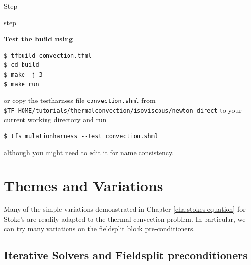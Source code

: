\begin{steps}{Step}
\begin{steps}{step}
   \end{steps}
  \item \textbf{Test the build using}
   \begin{lstlisting}[style=Bash]
$ tfbuild convection.tfml
$ cd build
$ make -j 3
$ make run
   \end{lstlisting}
or copy the testharness file \texttt{convection.shml} from
\texttt{\$TF\_HOME/tutorials/thermalconvection/isoviscous/newton\_direct}
to your current working directory and run
\begin{lstlisting}[style=Bash]
  $ tfsimulationharness --test convection.shml 
\end{lstlisting}
although you might need to edit it for name consistency.

\end{steps}


\section{Themes and Variations}

Many of the simple variations demonstrated in Chapter
\ref{cha:stokes-equation} for Stoke's  are readily adapted
to the thermal convection problem.  In particular, we can try many
variations on the fieldsplit block pre-conditioners.

\subsection{Iterative Solvers and Fieldsplit preconditioners}

